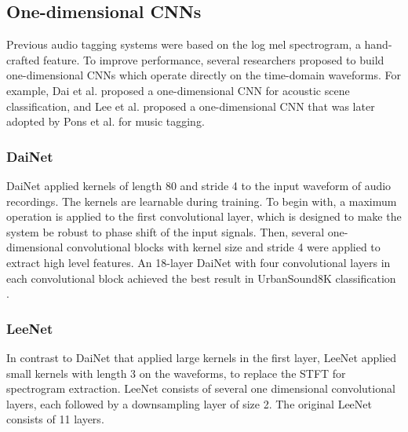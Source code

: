 \documentclass[journal]{IEEEtran}
\begin{document}
\subsection{One-dimensional CNNs}

Previous audio tagging systems were based on the log mel spectrogram, a hand-crafted feature. To improve performance, several researchers proposed to build one-dimensional CNNs which operate directly on the time-domain waveforms. For example, Dai et al. \cite{dai2017very} proposed a one-dimensional CNN for acoustic scene classification, and Lee et al. \cite{lee2017sample} proposed a one-dimensional CNN that was later adopted by Pons et al. \cite{pons2017end} for music tagging.

\subsubsection{DaiNet}

DaiNet \cite{dai2017very} applied kernels of length 80 and stride 4 to the input waveform of audio recordings. The kernels are learnable during training. To begin with, a maximum operation is applied to the first convolutional layer, which is designed to make the system be robust to phase shift of the input signals. Then, several one-dimensional convolutional blocks with kernel size  and stride 4 were applied to extract high level features. An 18-layer DaiNet with four convolutional layers in each convolutional block achieved the best result in UrbanSound8K \cite{salamon2014dataset} classification \cite{dai2017very}. 

\subsubsection{LeeNet}

In contrast to DaiNet that applied large kernels in the first layer, LeeNet \cite{lee2017sample} applied small kernels with length 3 on the waveforms, to replace the STFT for spectrogram extraction. LeeNet consists of several one dimensional convolutional layers, each followed by a downsampling layer of size 2. The original LeeNet consists of 11 layers. 
\end{document}
